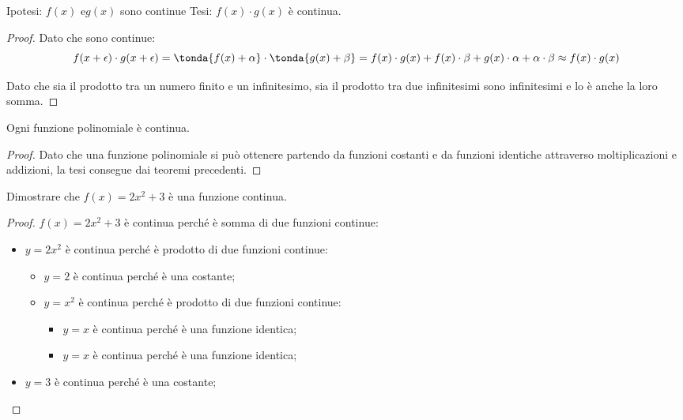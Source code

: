 \noindent Ipotesi: 
\(f(x) \text{ e} g(x)\) sono continue
\tab Tesi: 
\(f(x) \cdot g(x)\) è continua.

\begin{proof}
Dato che sono continue: 
\[f(x+\epsilon) \cdot g(x+\epsilon) = 
\tonda{f(x)+\alpha} \cdot \tonda{g(x)+\beta} = 
f(x) \cdot g(x) + f(x) \cdot \beta + g(x) \cdot \alpha + \alpha \cdot \beta
\approx f(x) \cdot g(x)\]

Dato che sia il prodotto tra un numero finito e un infinitesimo, sia il 
prodotto tra due infinitesimi sono infinitesimi e lo è anche la loro somma. 
\end{proof}

\begin{corollario}
 Ogni funzione polinomiale è continua.
\end{corollario}

\begin{proof}
Dato che una funzione polinomiale si può ottenere partendo da funzioni 
costanti e da funzioni identiche attraverso moltiplicazioni e addizioni, 
la tesi consegue dai teoremi precedenti. 
\end{proof}

\begin{esempio}
 Dimostrare che \(f(x)=2x^2 + 3\) è una funzione continua.

\begin{proof}

\(f(x)=2x^2 + 3\) è continua perché è somma di due funzioni continue: 
 \begin{itemize}[nosep]
  \item \(y=2x^2\) è continua perché è prodotto di due funzioni continue:
  \begin{itemize}[nosep]
   \item \(y=2\) è continua perché è una costante;
   \item \(y=x^2\) è continua perché è prodotto di due funzioni continue:
   \begin{itemize}[nosep]
    \item \(y=x\) è continua perché è una funzione identica;
    \item \(y=x\) è continua perché è una funzione identica;
   \end{itemize}
  \end{itemize}
  \item \(y=3\) è continua perché è una costante;
 \end{itemize}
\end{proof}

\end{esempio}


